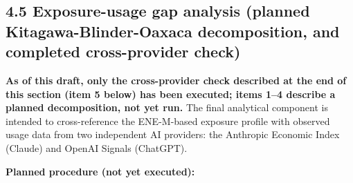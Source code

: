 \documentclass[
  11pt,
]{article}
\begin{document}
\subsection{4.5 Exposure-usage gap analysis (planned
Kitagawa-Blinder-Oaxaca decomposition, and completed cross-provider
check)}\label{exposure-usage-gap-analysis-planned-kitagawa-blinder-oaxaca-decomposition-and-completed-cross-provider-check}

\textbf{As of this draft, only the cross-provider check described at the
end of this section (item 5 below) has been executed; items 1--4
describe a planned decomposition, not yet run.} The final analytical
component is intended to cross-reference the ENE-M-based exposure
profile with observed usage data from two independent AI providers: the
Anthropic Economic Index (Claude) and OpenAI Signals (ChatGPT).

\textbf{Planned procedure (not yet executed):}
\end{document}
